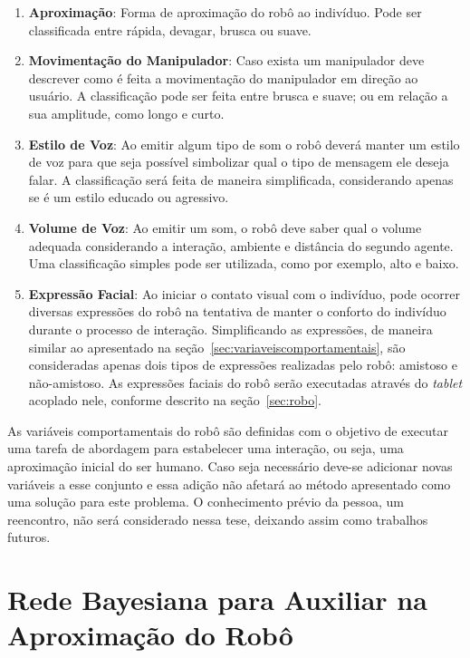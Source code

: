 \begin{enumerate}
	\item \textbf{Aproximação}: Forma de aproximação do robô ao indivíduo. Pode ser classificada entre rápida, devagar, brusca ou suave.
	\item \textbf{Movimentação do Manipulador}: Caso exista um manipulador deve descrever como é feita a movimentação do manipulador em direção ao usuário. A classificação pode ser feita entre brusca e suave; ou em relação a sua amplitude, como longo e curto.
	\item \textbf{Estilo de Voz}: Ao emitir algum tipo de som o robô deverá manter um estilo de voz para que seja possível simbolizar qual o tipo de mensagem ele deseja falar. A classificação será feita de maneira simplificada, considerando apenas se é um estilo educado ou agressivo.
	\item \textbf{Volume de Voz}: Ao emitir um som, o robô deve saber qual o volume adequada considerando a interação, ambiente e distância do segundo agente. Uma classificação simples pode ser utilizada, como por exemplo, alto e baixo.
	\item \textbf{Expressão Facial}: Ao iniciar o contato visual com o indivíduo, pode ocorrer diversas expressões do robô na tentativa de manter o conforto do indivíduo durante o processo de interação. Simplificando as expressões, de maneira similar ao apresentado na seção~\ref{sec:variaveiscomportamentais}, são consideradas apenas dois tipos de expressões realizadas pelo robô: amistoso e não-amistoso. As expressões faciais do robô serão executadas através do \emph{tablet} acoplado nele, conforme descrito na seção~\ref{sec:robo}.
\end{enumerate}

As variáveis comportamentais do robô são definidas com o objetivo de executar uma tarefa de abordagem para estabelecer uma interação, ou seja, uma aproximação inicial do ser humano. Caso seja necessário deve-se adicionar novas variáveis a esse conjunto e essa adição não afetará ao método apresentado como uma solução para este problema. O conhecimento prévio da pessoa, um reencontro, não será considerado nessa tese, deixando assim como trabalhos futuros.

\section{Rede Bayesiana para Auxiliar na Aproximação do Robô}
\label{sec:rede-bayesiana}

